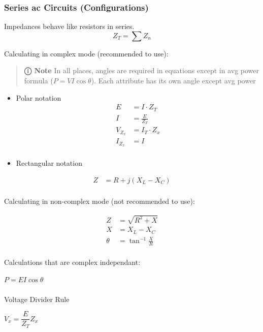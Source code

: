 \documentclass[
  a4paper,
]{article}
\makeatletter
\let\oldparagraph\paragraph
\renewcommand{\paragraph}{
    \@ifstar
      \xxxParagraphStar
      \xxxParagraphNoStar
  }
\newcommand{\xxxParagraphStar}[1]{\oldparagraph*{#1}\mbox{}}
\newcommand{\xxxParagraphNoStar}[1]{\oldparagraph{#1}\mbox{}}
\makeatother
\begin{document}
\subsubsection{Series ac Circuits
(Configurations)}\label{series-ac-circuits-configurations}

Impedances behave like resistors in series. \[Z_T = \sum Z_n\]

Calculating in complex mode (recommended to use):

\begin{quote}
\textbf{ⓘ Note} In all places, angles are required in equations except
in avg power formula (\(P=VI\cos\theta\)). Each attribute has its own
angle except avg power
\end{quote}

\begin{itemize}
\item
  Polar notation \[
  \begin{align*}
    E &= I \cdot Z_T \\
    I &= \frac{E}{Z_T} \\
    V_{Z_x} &= I_T \cdot Z_x \\
    I_{Z_x} &= I \\
  \end{align*}
  \]
\item
  Rectangular notation
\end{itemize}

\[
\begin{align*}
    Z &= R+j(X_L-X_C) \\
\end{align*}
\]

Calculating in non-complex mode (not recommended to use):

\[
\begin{align*}
    Z &= \sqrt{R^2+X} \\
    X &= X_L-X_C\\
    \theta &= \tan^{-1} \frac{X}{R} \\
\end{align*}
\]

Calculations that are complex independant:

\(P=EI\cos\theta\)

\paragraph{Voltage Divider Rule}\label{voltage-divider-rule}

\(V_x = \dfrac{E}{Z_T}Z_x\)
\end{document}
